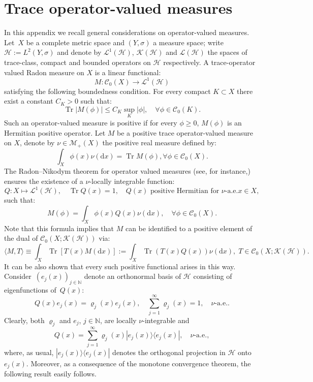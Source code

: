 \documentclass[10pt]{amsart}
\theoremstyle{definition}
\DeclareMathOperator{\Trr}{Tr}
\newcommand*\N{{\mathbb N}}
\newcommand*\Tr{\Trr}
\newcommand{\To}{\longrightarrow}
\numberwithin{equation}{section}
\let\oldforall\forall
\renewcommand*{\forall}{\mathrel{\oldforall}}
\newcommand*{\dd}{\mathrm{d}}
\newcommand*{\dx}{\dd x}
\begin{document}
\section{Trace operator-valued measures}\label{sec:ovm}
In this appendix we recall general considerations on operator-valued measures. Let~$X$ be a complete metric space and $(Y,\sigma)$ a measure space; write $\mathcal{H}:=L^2(Y,\sigma)$ and denote by $\mathcal{L}^1(\mathcal{H})$, $\mathcal{K}(\mathcal{H})$ and $\mathcal{L}(\mathcal{H})$ the spaces of trace-class, compact and bounded operators on $\mathcal{H}$ respectively. A trace-operator valued Radon measure on $X$ is a linear functional:
\[
M:\mathcal{C}_0(X)\To \mathcal{L}^1(\mathcal{H})
\]
satisfying the following boundedness condition. For every compact $K\subset X$ there exist a constant $C_K>0$ such that:
\[
\Tr|M(\phi)|\leq C_K \sup_K|\phi|,\quad \forall \phi\in\mathcal{C}_0(K).
\]
Such an operator-valued measure is positive if for every $\phi\geq0$, $M(\phi)$ is an Hermitian positive operator. Let $M$ be a positive trace operator-valued measure on $X$, denote by $\nu\in\mathcal{M}_+(X)$ the positive real measure defined by:
\[
\int_X\phi(x)\nu(\dx)=\Tr M(\phi), \forall \phi\in\mathcal{C}_0(X).
\]
The Radon--Nikodym theorem for operator valued measures (see, for instance,\linebreak \cite[the Appendix]{GerardMDM91}) ensures the existence of a $\nu$-locally integrable function:
\[
Q:X\longmapsto \mathcal{L}^1(\mathcal{H}),\quad \Tr Q(x)=1, \quad Q(x) \text{ positive Hermitian for } \nu \text{-a.e.} x\in X,
\]
such that:
\[
M(\phi)=\int_X \phi(x) Q(x)\nu(\dx),\quad \forall \phi\in\mathcal{C}_0(X).
\]
Note that this formula implies that $M$ can be identified to a positive element of the dual of $\mathcal{C}_0(X;\mathcal{K}(\mathcal{H}))$ via:
\[
\langle M, T \rangle \equiv \int_X \Tr[T(x)M(\dx)]:=\int_X \Tr(T(x)Q(x))\nu(\dx),\;T\in \mathcal{C}_0(X;\mathcal{K}(\mathcal{H})).
\]
It can be also shown that every such positive functional arises in this way. \linebreak Consider~$(e_j(x))_{j\in\N}$ denote an orthonormal basis of $\mathcal{H}$ consisting of eigenfunctions of~$Q(x)$:
\[
Q(x)e_j(x)=\varrho_j(x) e_j(x),\quad \sum_{j=1}^\infty \varrho_j(x)=1,\quad \nu\text{-a.e.}.
\]
Clearly, both $\varrho_j$ and $e_j$, $j\in\N$, are locally $\nu$-integrable and
\[
Q(x)=\sum_{j=1}^\infty \varrho_j(x)|e_j(x)\rangle \langle e_j(x)|,\quad \nu\text{-a.e.},
\]
where, as usual, $|e_j(x)\rangle \langle e_j(x)|$ denotes the orthogonal projection in $\mathcal{H}$ onto $e_j(x)$. Moreover, as a consequence of the monotone convergence theorem, the following result easily follows.
\end{document}
